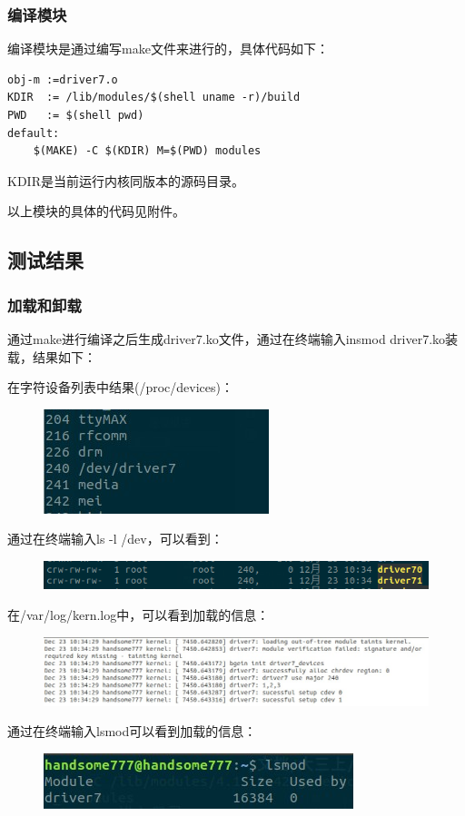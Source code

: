 \documentclass[UTF8]{ctexart}
\begin{document}
\subsubsection{编译模块}
编译模块是通过编写make文件来进行的，具体代码如下：\par
\lstset{language = make}
\begin{lstlisting}
obj-m :=driver7.o
KDIR  := /lib/modules/$(shell uname -r)/build
PWD   := $(shell pwd)
default:
	$(MAKE) -C $(KDIR) M=$(PWD) modules
\end{lstlisting}
KDIR是当前运行内核同版本的源码目录。

以上模块的具体的代码见附件。

\subsection{测试结果}
\subsubsection{加载和卸载}
通过make进行编译之后生成driver7.ko文件，通过在终端输入insmod driver7.ko装载，结果如下：\par
在字符设备列表中结果(/proc/devices)：\newpage
\begin{figure}[!h]
\centering
\includegraphics[scale = 1.0,bb=0 0 179 83]{5_2.jpg}
\label{img7}
\end{figure}
通过在终端输入ls -l /dev，可以看到：\par
\begin{figure}[!h]
\centering
\includegraphics[scale = 1.0,bb=0 0 445 33]{5_3.png}
\label{img8}
\end{figure}
在/var/log/kern.log中，可以看到加载的信息：\par
\begin{figure}[!h]
\centering
\includegraphics[scale = 0.6,bb=0 0 687 123]{5_4.jpg}
\label{img9}
\end{figure}
通过在终端输入lsmod可以看到加载的信息：\par
\begin{figure}[!h]
\centering
\includegraphics[scale = 1.0,bb=0 0 246 44]{5_5.jpg}
\label{img10}
\end{figure}
\end{document}
